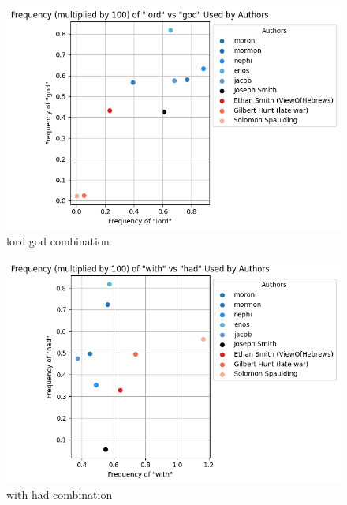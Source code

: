 \documentclass[
  letterpaper,
  DIV=11,
  numbers=noendperiod]{scrartcl}
\begin{document}
\begin{figure}

{\centering \includegraphics{Graphs/Word Comparisons/lord_god_output.png}

}

\caption{lord god combination}

\end{figure}

\begin{figure}

{\centering \includegraphics{Graphs/Word Comparisons/with_had_output.png}

}

\caption{with had combination}

\end{figure}
\end{document}
